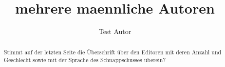 \documentclass{snapshotmfo}
\author{Test Autor}
\title{mehrere maennliche Autoren}
\begin{document}
\begin{abstract}
Stimmt auf der letzten Seite die Überschrift über den Editoren mit deren Anzahl und Geschlecht sowie mit 
der Sprache des Schnappschusses überein?
\end{abstract}
\end{document}
